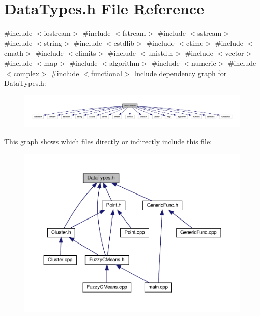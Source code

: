 \section{Data\+Types.\+h File Reference}
\label{_data_types_8h}
{\ttfamily \#include $<$iostream$>$}\newline
{\ttfamily \#include $<$fstream$>$}\newline
{\ttfamily \#include $<$sstream$>$}\newline
{\ttfamily \#include $<$string$>$}\newline
{\ttfamily \#include $<$cstdlib$>$}\newline
{\ttfamily \#include $<$ctime$>$}\newline
{\ttfamily \#include $<$cmath$>$}\newline
{\ttfamily \#include $<$climits$>$}\newline
{\ttfamily \#include $<$unistd.\+h$>$}\newline
{\ttfamily \#include $<$vector$>$}\newline
{\ttfamily \#include $<$map$>$}\newline
{\ttfamily \#include $<$algorithm$>$}\newline
{\ttfamily \#include $<$numeric$>$}\newline
{\ttfamily \#include $<$complex$>$}\newline
{\ttfamily \#include $<$functional$>$}\newline
Include dependency graph for Data\+Types.\+h\+:
\nopagebreak
\begin{figure}[H]
\begin{center}
\leavevmode
\includegraphics[width=350pt]{_data_types_8h__incl}
\end{center}
\end{figure}
This graph shows which files directly or indirectly include this file\+:
\nopagebreak
\begin{figure}[H]
\begin{center}
\leavevmode
\includegraphics[width=350pt]{_data_types_8h__dep__incl}
\end{center}
\end{figure}
